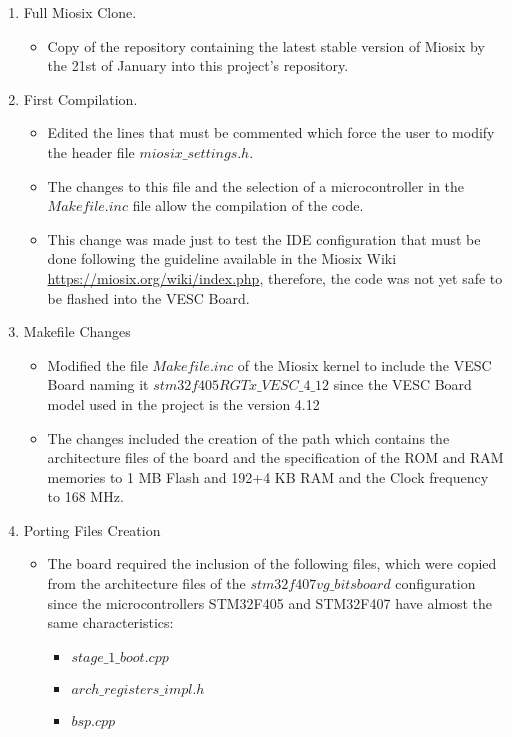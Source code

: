 \begin{enumerate}
	\item Full Miosix Clone. 
		\begin {itemize}
			\item Copy of the repository containing the latest stable version of Miosix by the 21st of January into this project's repository.
		\end {itemize}
	\item First Compilation.
		\begin {itemize}
			\item Edited the lines that must be commented which force the user to modify the header file $miosix\_settings.h$.
			\item The changes to this file and the selection of a microcontroller in the $Makefile.inc$ file allow the compilation of the code.
			\item This change was made just to test the IDE configuration that must be done following the guideline available in the Miosix Wiki \url{https://miosix.org/wiki/index.php}, therefore, the code was not yet safe to be flashed into the VESC Board.
		\end {itemize}
	\item Makefile Changes
		\begin {itemize}
			\item Modified the file $Makefile.inc$ of the Miosix kernel to include the VESC Board naming it $stm32f405RGTx\_VESC\_4\_12$ since the VESC Board model used in the project is the version 4.12
			\item The changes included the creation of the path which contains the architecture files of the board and the specification of the ROM and RAM memories to 1 MB Flash and 192+4 KB RAM \cite{STM32F405Datasheet} and the Clock frequency to 168 MHz.
		\end {itemize}
	\item Porting Files Creation
		\begin {itemize}
			\item The board required the inclusion of the following files, which were copied from the architecture files of the $stm32f407vg\_bitsboard$ configuration since the microcontrollers STM32F405 and STM32F407 have almost the same characteristics:
				\begin {itemize}
					\item $stage\_1\_boot.cpp$
					\item $arch\_registers\_impl.h$
					\item $bsp.cpp$

\end{itemize}
\end{itemize}
\end{enumerate}
